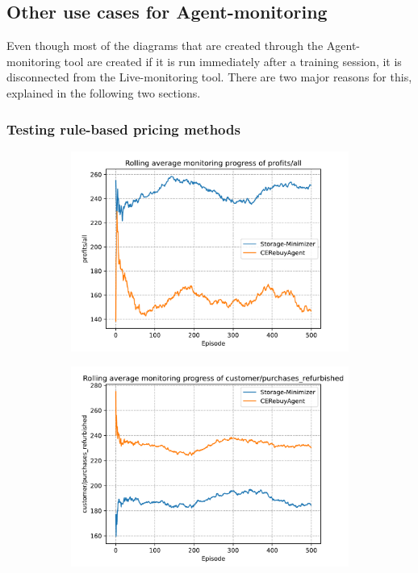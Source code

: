 \subsection{Other use cases for Agent-monitoring}

Even though most of the diagrams that are created through the Agent-monitoring tool are created if it is run immediately after a training session, it is disconnected from the Live-monitoring tool. There are two major reasons for this, explained in the following two sections.

\subsubsection{Testing rule-based pricing methods}

\begin{figure}[ht]
	\centering
	\begin{subfigure}{0.49\textwidth}
		\centering
		\includegraphics[width = \textwidth]{images/experiments/rulebased/RuleBasedMonitoringProfits.pdf}\\
		\label{fig:RulebasedAgentMonitoring1}
	\end{subfigure}
	\begin{subfigure}{0.49\textwidth}
		\centering
		\includegraphics[width = \textwidth]{images/experiments/rulebased/RuleBasedMonitoringPurchasesRefurbished.pdf}\\

\end{subfigure}
\end{figure}
